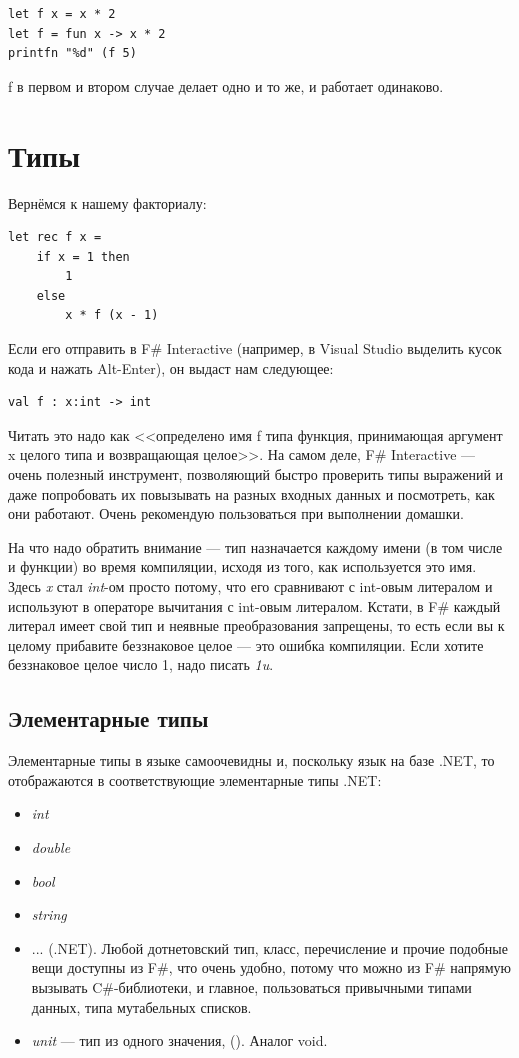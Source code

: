 \documentclass[a5paper]{article}
\begin{document}
\begin{verbatim}
let f x = x * 2
let f = fun x -> x * 2
printfn "%d" (f 5)
\end{verbatim}

f в первом и втором случае делает одно и то же, и работает одинаково.

\section{Типы}

Вернёмся к нашему факториалу:

\begin{verbatim}
let rec f x =
    if x = 1 then
        1
    else
        x * f (x - 1)
\end{verbatim}

Если его отправить в F\# Interactive (например, в Visual Studio выделить кусок кода и нажать Alt-Enter), он выдаст нам следующее:

\begin{verbatim}
val f : x:int -> int
\end{verbatim}

Читать это надо как <<определено имя f типа функция, принимающая аргумент x целого типа и возвращающая целое>>. На самом деле, F\# Interactive --- очень полезный инструмент, позволяющий быстро проверить типы выражений и даже попробовать их повызывать на разных входных данных и посмотреть, как они работают. Очень рекомендую пользоваться при выполнении домашки.

На что надо обратить внимание --- тип назначается каждому имени (в том числе и функции) во время компиляции, исходя из того, как используется это имя. Здесь \textit{x} стал \textit{int}-ом просто потому, что его сравнивают с int-овым литералом и используют в операторе вычитания с int-овым литералом. Кстати, в F\# каждый литерал имеет свой тип и неявные преобразования запрещены, то есть если вы к целому прибавите беззнаковое целое --- это ошибка компиляции. Если хотите беззнаковое целое число 1, надо писать \textit{1u}.

\subsection{Элементарные типы}

Элементарные типы в языке самоочевидны и, поскольку язык на базе .NET, то отображаются в соответствующие элементарные типы .NET:

\begin{itemize}
    \item \textit{int}
    \item \textit{double}
    \item \textit{bool}
    \item \textit{string}
    \item ... (.NET). Любой дотнетовский тип, класс, перечисление и прочие подобные вещи доступны из F\#, что очень удобно, потому что можно из F\# напрямую вызывать C\#-библиотеки, и главное, пользоваться привычными типами данных, типа мутабельных списков.
    \item \textit{unit} --- тип из одного значения, (). Аналог void.
\end{itemize}
\end{document}
